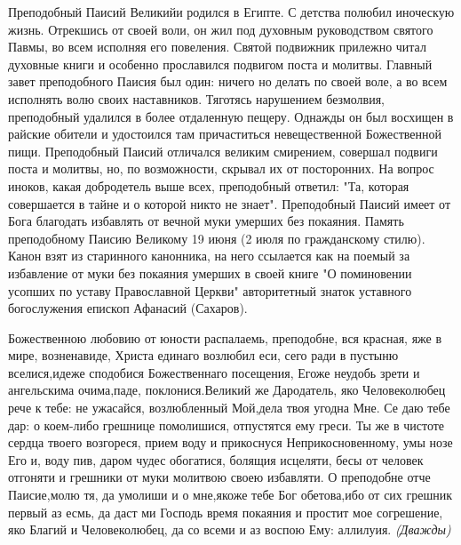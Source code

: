 




Преподобный Паисий Великийи родился в Египте. С детства полюбил иноческую жизнь. Отрекшись от своей воли, он жил под духовным руководством святого Павмы, во всем исполняя его повеления. Святой подвижник прилежно читал духовные книги и особенно прославился подвигом поста и молитвы. Главный завет преподобного Паисия был один:
ничего но делать по своей воле, а во всем исполнять волю своих наставников. Тяготясь нарушением безмолвия, преподобный удалился в более отдаленную пещеру. Однажды он был восхищен в райские обители и удостоился там причаститься невещественной Божественной пищи. Преподобный Паисий отличался великим смирением, совершал подвиги поста и молитвы, но, по возможности, скрывал их от посторонних. На вопрос иноков, какая добродетель выше всех, преподобный ответил: "Та, которая совершается в тайне и о которой никто не знает". Преподобный Паисий
имеет от Бога благодать избавлять от вечной муки умерших без покаяния. Память преподобному Паисию Великому 19 июня (2 июля по гражданскому стилю). Канон взят из старинного канонника, на него ссылается как на поемый за избавление от муки без покаяния умерших в своей книге "О поминовении усопших по уставу Православной Церкви" авторитетный знаток уставного богослужения епископ Афанасий (Сахаров).





Божественною любовию от юности распалаемь, преподобне, вся красная, яже в мире, возненавиде, Христа единаго возлюбил еси, сего ради в пустыню вселися,идеже сподобися Божественнаго посещения, Егоже неудобь зрети и ангельскима очима,паде, поклонися.Великий же Дародатель, яко Человеко­любец рече к тебе: не ужасайся, возлюб­ленный Мой,дела твоя угодна Мне. Се даю тебе дар: о коем-либо грешнице помолишися, отпустятся ему греси. Ты же в чистоте сердца твоего возгореся, прием воду и прикоснуся Неприкосно­венному, умы нозе Его и, воду пив, да­ром чудес обогатися, болящия исцеляти, бесы от человек отгоняти и грешни­ки от муки молитвою своею избавляти. О преподобне отче Паисие,молю тя, да умолиши и о мне,якоже тебе Бог обетова,ибо от сих грешник первый аз есмь, да даст ми Господь время покаяния и простит мое согрешение, яко Благий и Человеколюбец, да со всеми и аз воспою Ему: аллилуия. \itshape (Дважды)\normalfont{}


